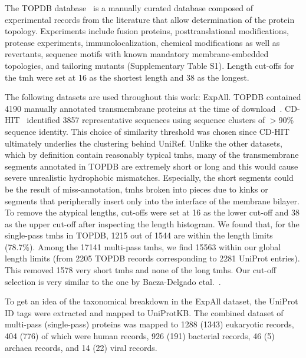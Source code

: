 The TOPDB database~\cite{Dobson2015} is a manually curated database composed of experimental records from the literature that allow determination of the protein topology. Experiments include fusion proteins, posttranslational modifications, protease experiments, immunolocalization, chemical modifications as well as revertants, sequence motifs with known mandatory membrane-embedded topologies, and tailoring mutants (Supplementary Table S1). Length cut-offs for the \gls{tmh} were set at 16 as the shortest length and 38 as the longest.

The following datasets are used throughout this work:
ExpAll. TOPDB contained 4190 manually annotated transmembrane proteins at the time of download~\cite{Dobson2015}. CD-HIT~\cite{Huang2010} identified 3857 representative sequences using sequence clusters of $>$90\% sequence identity. This choice of similarity threshold was chosen since CD-HIT ultimately underlies the clustering behind UniRef. Unlike the other datasets, which by definition contain reasonably typical \gls{tmh}s, many of the transmembrane segments annotated in TOPDB are extremely short or long and this would cause severe unrealistic hydrophobic mismatches. Especially, the short segments could be the result of miss-annotation, \gls{tmh}s broken into pieces due to kinks or segments that peripherally insert only into the interface of the membrane bilayer. To remove the atypical lengths, cut-offs were set at 16 as the lower cut-off and 38 as the upper cut-off after inspecting the length histogram. We found that, for the single-pass \gls{tmh}s in TOPDB, 1215 out of 1544 are within the length limits (78.7\%). Among the 17141 multi-pass \gls{tmh}s, we find 15563 within our global length limits (from 2205 TOPDB records corresponding to 2281 UniProt entries). This removed 1578 very short \gls{tmh}s and none of the long \gls{tmh}s. Our cut-off selection is very similar to the one by Baeza-Delgado etal.~\cite{Baeza-Delgado2013}.

To get an idea of the taxonomical breakdown in the ExpAll dataset, the UniProt ID tags were extracted and mapped to UniProtKB. The combined dataset of multi-pass (single-pass) proteins was mapped to 1288 (1343) eukaryotic records, 404 (776) of which were human records, 926 (191) bacterial records, 46 (5) archaea records, and 14 (22) viral records.

